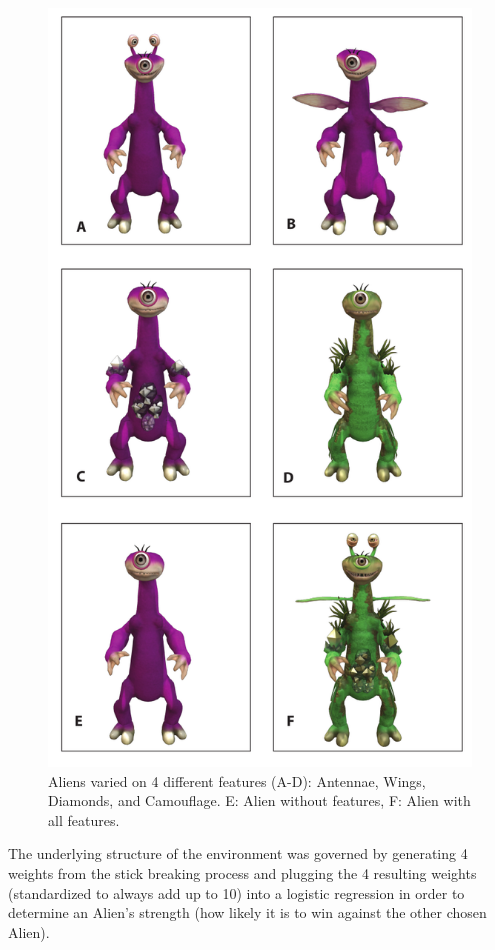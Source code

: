 \documentclass[10pt,letterpaper]{article}
\begin{document}
\begin{figure}[htb!]
		\centering
	\caption{Aliens varied on 4 different features (A-D): Antennae, Wings, Diamonds, and Camouflage. E: Alien without features, F: Alien with all features.}
	\label{Alien_features}
		\includegraphics[scale=0.3]{aliens.png}
\end{figure}
\noindent
The underlying structure of the environment was governed by generating 4 weights from the stick breaking process and plugging the 4 resulting weights (standardized to always add up to 10) into a logistic regression in order to determine an Alien's strength (how likely it is to win against the other chosen Alien).
\end{document}

